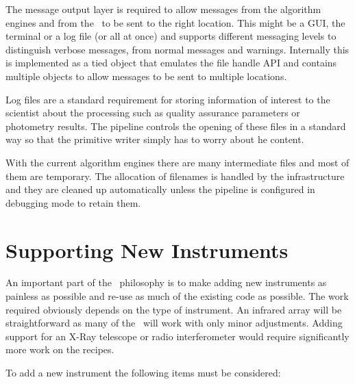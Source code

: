 \documentclass[final,authoryear,5p,times,twocolumn]{elsarticle}
\begin{document}
The message output layer is required
to allow messages from the algorithm engines and from the \primitives\
to be sent to the right location. This might be a GUI, the terminal or
a log file (or all at once) and supports different messaging levels to
distinguish verbose messages, from normal messages and
warnings. Internally this is implemented as a tied object that
emulates the file handle API and contains multiple objects to allow
messages to be sent to multiple locations.

Log files are a standard requirement for storing information of
interest to the scientist about the processing such as
quality assurance parameters or photometry results. The pipeline
controls the opening of these files in a standard way so that the
primitive writer simply has to worry about he content.

With the current algorithm engines there are many intermediate files
and most of them are temporary. The allocation of filenames is handled
by the infrastructure and they are cleaned up automatically unless the
pipeline is configured in debugging mode to retain them.

\section{Supporting New Instruments}

An important part of the \oracdr\ philosophy is to make adding new
instruments as painless as possible and re-use as much of the
existing code as possible. The work required obviously depends on the
type of instrument. An infrared array will be straightforward as many
of the \recipes\ will work with only minor adjustments. Adding support
for an X-Ray telescope or radio interferometer would require
significantly more work on the recipes.

To add a new instrument the following items must be considered:
\end{document}
